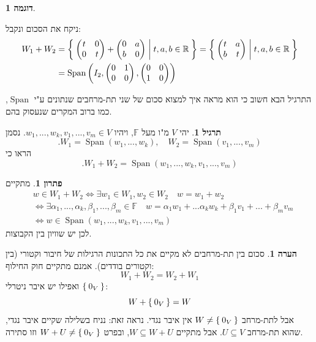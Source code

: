 \documentclass[12pt]{report}
\theoremstyle{plain}
\theoremstyle{definition}
\newtheorem{example}{דוגמה}[chapter]
\newtheorem{exercise}{תרגיל}[chapter]
\newtheorem{remark}{הערה}[chapter]
\newtheorem*{solution}{פתרון}
\newcommand{\R}{\mathbb{R}}
\newcommand{\F}{\mathbb{F}}
\newcommand{\0}{\mathbf{0}}
\DeclareMathOperator{\Span}{Span}
\begin{document}
\begin{example}
\begin{enumerate}[label=\alph*.]
ניקח את הסכום ונקבל:
$$
\begin{aligned}
W_1+W_2&=\Set{\begin{pmatrix}
t & 0 \\
0 & t
\end{pmatrix}+\begin{pmatrix}
0 & a \\
b & 0
\end{pmatrix}|t,a,b\in\R
}=\Set{\begin{pmatrix}
t & a \\
b & t
\end{pmatrix}|t,a,b\in\R} \\
&=\Span\left(I_2,\begin{pmatrix}
0 & 1 \\
0 & 0
\end{pmatrix},\begin{pmatrix}
0 & 0 \\
1 & 0
\end{pmatrix}\right)
\end{aligned}
$$


\end{enumerate}
\end{example}

התרגיל הבא חשוב כי הוא מראה איך למצוא סכום של שני תת-מרחבים שנתונים ע"י 
$\Span$,
כמו ברוב המקרים שנעסוק בהם.

\begin{exercise}
יהי 
$V$
מ"ו מעל
$\F$,
ויהיו 
$w_1,...,w_k,v_1,...,v_m\in V$.
נסמן
$$
.W_1=\Span(w_1,...,w_k),\quad W_2=\Span(v_1,...,v_m)
$$
הראו כי
$$
.W_1+W_2=\Span(w_1,...,w_k,v_1,...,v_m)
$$
\end{exercise}

\begin{solution}
מתקיים
$$
\begin{aligned}
&w\in W_1+W_2 \iff \exists w_1\in W_1, w_2\in W_2 \quad w=w_1+w_2 \\
&\iff \exists \alpha_1,...,\alpha_k,\beta_1,...,\beta_m\in\F \quad w=\alpha_1w_1+...\alpha_kw_k+\beta_1v_1+...+\beta_mv_m \\
&\iff w\in\Span(w_1,...,w_k,v_1,...,v_m)
\end{aligned}
$$
לכן יש שוויון בין הקבוצות.

\end{solution}

\begin{remark}
סכום בין תת-מרחבים לא מקיים את כל התכונות הרגילות של חיבור וקטורי (בין וקטורים בודדים). אמנם מתקיים חוק החילוף:
$$
W_1+W_2=W_2+W_1
$$
ואפילו יש איבר ניטרלי
$\Set{0_V}$:
$$
W+\Set{0_V}=W
$$
אבל לתת-מרחב 
$W\neq\Set{0_V}$
אין איבר נגדי. נראה זאת: נניח בשלילה שקיים איבר נגדי, שהוא תת-מרחב
$U\subseteq V$.
אבל מתקיים
$W\subseteq W+U$,
ובפרט 
$W+U\neq \Set{0_V}$
וזו סתירה.
\end{remark}
\end{document}
